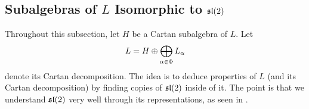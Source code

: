 \subsection{Subalgebras of $L$ Isomorphic to $\sl{2}$}

Throughout this subsection, let $H$ be a Cartan subalgebra of $L$. Let
\begin{align*}
    L = H \+ \bigoplus_{\alpha \in \Phi} L_{\alpha}
\end{align*}
denote its Cartan decomposition. The idea is to deduce properties of $L$ (and its Cartan decomposition) by finding copies of $\sl{2}$ inside of it. The point is that we understand $\sl{2}$ very well through its representations, as seen in .

